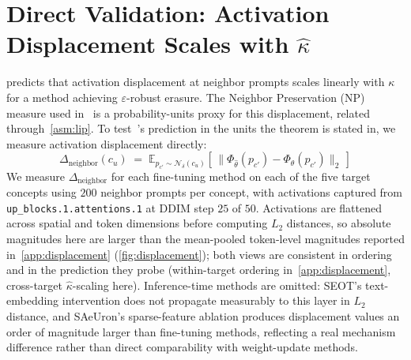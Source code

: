 \section{Direct Validation: Activation Displacement Scales with $\hat\kappa$}
\label{app:displacement_kappa}
 predicts that activation displacement at neighbor prompts scales linearly with $\kappa$ for a method achieving $\varepsilon$-robust erasure. The Neighbor Preservation (NP) measure used in~ is a probability-units proxy for this displacement, related through~\cref{asm:lip}. To test~'s prediction in the units the theorem is stated in, we measure activation displacement directly:
\[
\Delta_{\text{neighbor}}(c_u) \;=\; \mathbb{E}_{p_{c'} \sim \mathcal{N}_\delta(c_u)}\!\left[\, \big\| \Phi_{\hat\theta}(p_{c'}) - \Phi_\theta(p_{c'}) \big\|_2 \,\right]
\]
We measure $\Delta_{\text{neighbor}}$ for each fine-tuning method on each of the five target concepts using $200$ neighbor prompts per concept, with activations captured from \texttt{up\_blocks.1.attentions.1} at DDIM step $25$ of $50$. Activations are flattened across spatial and token dimensions before computing $L_2$ distances, so absolute magnitudes here are larger than the mean-pooled token-level magnitudes reported in~\cref{app:displacement} (\cref{fig:displacement}); both views are consistent in ordering and in the prediction they probe (within-target ordering in~\cref{app:displacement}, cross-target $\hat\kappa$-scaling here). Inference-time methods are omitted: SEOT's text-embedding intervention does not propagate measurably to this layer in $L_2$ distance, and SAeUron's sparse-feature ablation produces displacement values an order of magnitude larger than fine-tuning methods, reflecting a real mechanism difference rather than direct comparability with weight-update methods.

